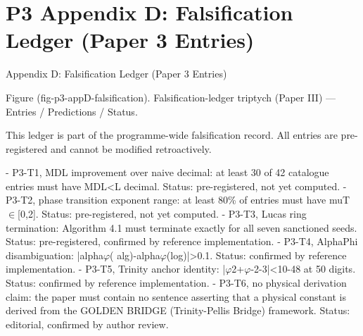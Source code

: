 
\section{P3 Appendix D: Falsification Ledger (Paper 3 Entries)}

Appendix D: Falsification Ledger (Paper 3 Entries)

   Figure (fig-p3-appD-falsification). Falsification-ledger triptych (Paper III) --- Entries / Predictions
                                                  / Status.

  This ledger is part of the programme-wide falsification record. All entries are
  pre-registered and cannot be modified retroactively.

  - P3-T1, MDL improvement over naive decimal: at least 30 of 42 catalogue entries must
  have MDL<L decimal. Status: pre-registered, not yet computed.
  - P3-T2, phase transition exponent range: at least 80\% of entries must have muT$\in$[0,2].
  Status: pre-registered, not yet computed.
  - P3-T3, Lucas ring termination: Algorithm 4.1 must terminate exactly for all seven
  sanctioned seeds. Status: pre-registered, confirmed by reference implementation.
  - P3-T4, AlphaPhi disambiguation: |alpha$\varphi$( alg)-alpha$\varphi$(log)|>0.1. Status: confirmed by
  reference implementation.
  - P3-T5, Trinity anchor identity: |$\varphi$2+$\varphi$-2-3|<10-48 at 50 digits. Status: confirmed by
  reference implementation.
  - P3-T6, no physical derivation claim: the paper must contain no sentence asserting that
  a physical constant is derived from the GOLDEN BRIDGE (Trinity-Pellis Bridge) framework. Status: editorial,
  confirmed by author review.
